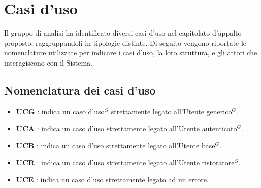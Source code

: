 \section{Casi d'uso}

Il gruppo di analisi ha identificato diversi casi d'uso nel capitolato d'appalto proposto, raggruppandoli in tipologie distinte.
Di seguito vengono riportate le nomenclature utilizzate per indicare i casi d'uso, la loro struttura, e gli attori che interagiscono con il Sistema.

\subsection{Nomenclatura dei casi d'uso}
\begin{itemize}
	\item \textbf{UCG} : indica un caso d'uso$^G$ strettamente legato all'Utente generico$^G$.
	\item \textbf{UCA} : indica un caso d'uso strettamente legato all'Utente autenticato$^G$.
	\item \textbf{UCB} : indica un caso d'uso strettamente legato all'Utente base$^G$.
	\item \textbf{UCR} : indica un caso d'uso strettamente legato all'Utente ristoratore$^G$.
	\item \textbf{UCE} : indica un caso d'uso strettamente legato ad un errore.
\end{itemize}
